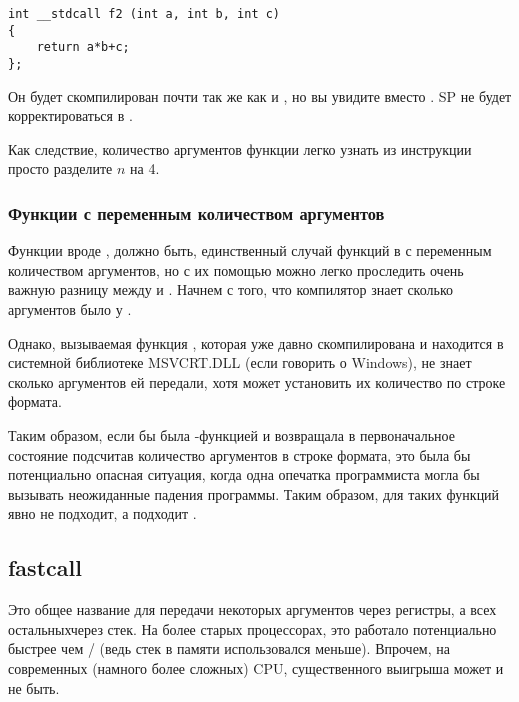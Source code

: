\begin{lstlisting}
int __stdcall f2 (int a, int b, int c)
{
	return a*b+c;
};
\end{lstlisting}

Он будет скомпилирован почти так же как и ,
но вы увидите  вместо . 
\ac{SP} не будет корректироваться в .

Как следствие, количество аргументов функции легко узнать из инструкции  просто разделите
$n$ на 4.



\subsubsection{Функции с переменным количеством аргументов}

Функции вроде \printf, должно быть, единственный случай функций в \CCpp с переменным количеством аргументов,
но с их помощью можно легко проследить очень важную разницу между  и .
Начнем с того, что компилятор знает сколько аргументов было у \printf.

Однако, вызываемая функция \printf, которая уже давно скомпилирована 
и находится в системной библиотеке MSVCRT.DLL (если говорить о Windows), 
не знает сколько аргументов ей передали, хотя может установить их количество по строке формата.

Таким образом, если бы \printf была -функцией и возвращала  в первоначальное состояние 
подсчитав количество аргументов в строке формата, это была бы потенциально опасная ситуация, 
когда одна опечатка программиста могла бы вызывать неожиданные падения программы. 
Таким образом, для таких функций  явно не подходит, а подходит .

\subsection{fastcall}
\label{fastcall}

Это общее название для передачи некоторых аргументов через регистры, а всех остальных\EMDASH{}через стек.
На более старых процессорах, это работало потенциально быстрее чем / (ведь стек в памяти использовался меньше).
Впрочем, на современных (намного более сложных) CPU, существенного выигрыша может и не быть.

